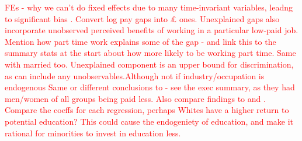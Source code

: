 \documentclass[class=article, crop=false]{standalone}
\begin{document}
\textcolor{red}{FEs - why we can't do fixed effects due to many time-invariant variables, leadng to significant bias \citep{Heitmueller}. Convert log pay gaps into £ ones. Unexplained gaps also incorporate unobserved perceived benefits of working in a particular low-paid job.
Mention how part time work explains some of the gap - and link this to the summary stats at the start about how more likely to be working part time. Same with married too.
Unexplained component is an upper bound for discrimination, as can include any unobservables.Although not if industry/occupation is endogenous
Same or different conclusions to \citep{Longhi2} - see the exec summary, as they had men/women of all groups being paid less.
Also compare findings to \citep{Shields} and \citep{ONSe}. Compare the coeffs for each regression, perhaps Whites have a higher return to potential education? This could cause the endogeniety of education, and make it rational for minorities to invest in education less.}


\ifstandalone

\fi
\end{document}
